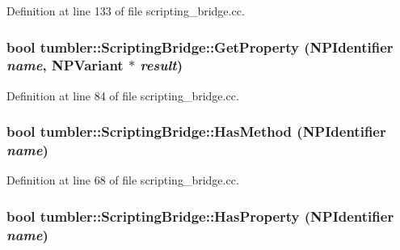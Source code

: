 Definition at line 133 of file scripting\_\-bridge.cc.

\hypertarget{classtumbler_1_1_scripting_bridge_a7f8c653d8a5cb632eae37e1d59459c31}{
\subsubsection[{GetProperty}]{\setlength{\rightskip}{0pt plus 5cm}bool tumbler::ScriptingBridge::GetProperty ({\bf NPIdentifier} {\em name}, \/  {\bf NPVariant} $\ast$ {\em result})}}
\label{classtumbler_1_1_scripting_bridge_a7f8c653d8a5cb632eae37e1d59459c31}


Definition at line 84 of file scripting\_\-bridge.cc.

\hypertarget{classtumbler_1_1_scripting_bridge_acd4789c8a9668e86ad02949ac7e88481}{
\subsubsection[{HasMethod}]{\setlength{\rightskip}{0pt plus 5cm}bool tumbler::ScriptingBridge::HasMethod ({\bf NPIdentifier} {\em name})}}
\label{classtumbler_1_1_scripting_bridge_acd4789c8a9668e86ad02949ac7e88481}


Definition at line 68 of file scripting\_\-bridge.cc.

\hypertarget{classtumbler_1_1_scripting_bridge_af5fea670d935111ef96b2ecc3adc8576}{
\subsubsection[{HasProperty}]{\setlength{\rightskip}{0pt plus 5cm}bool tumbler::ScriptingBridge::HasProperty ({\bf NPIdentifier} {\em name})}}
\label{classtumbler_1_1_scripting_bridge_af5fea670d935111ef96b2ecc3adc8576}


